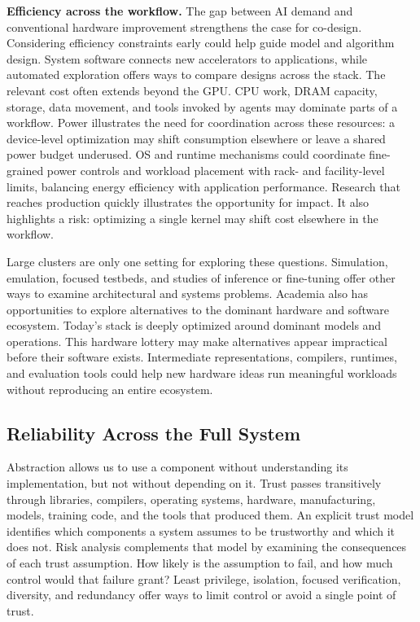 \documentclass[manuscript]{acmart}
\begin{document}
\textbf{Efficiency across the workflow.} The gap between AI demand and conventional hardware improvement strengthens the case for co-design.
Considering efficiency constraints early could help guide model and algorithm design.
System software connects new accelerators to applications, while automated exploration offers ways to compare designs across the stack.
The relevant cost often extends beyond the GPU.
CPU work, DRAM capacity, storage, data movement, and tools invoked by agents may dominate parts of a workflow.
Power illustrates the need for coordination across these resources: a device-level optimization may shift consumption elsewhere or leave a shared power budget underused.
OS and runtime mechanisms could coordinate fine-grained power controls and workload placement with rack- and facility-level limits, balancing energy efficiency with application performance.
Research that reaches production quickly illustrates the opportunity for impact.
It also highlights a risk: optimizing a single kernel may shift cost elsewhere in the workflow.

Large clusters are only one setting for exploring these questions.
Simulation, emulation, focused testbeds, and studies of inference or fine-tuning offer other ways to examine architectural and systems problems.
Academia also has opportunities to explore alternatives to the dominant hardware and software ecosystem.
Today's stack is deeply optimized around dominant models and operations.
This hardware lottery may make alternatives appear impractical before their software exists.
Intermediate representations, compilers, runtimes, and evaluation tools could help new hardware ideas run meaningful workloads without reproducing an entire ecosystem.

\subsection{Reliability Across the Full System}
\label{sec:reliability}

Abstraction allows us to use a component without understanding its implementation,
but not without depending on it.
Trust passes transitively through libraries, compilers, operating systems,
hardware, manufacturing, models, training code, and the tools that produced them.
An explicit trust model identifies which components a system assumes to be trustworthy and which it does not.
Risk analysis complements that model by examining the consequences of each trust assumption.
How likely is the assumption to fail, and how much control would that failure grant?
Least privilege, isolation, focused verification, diversity, and redundancy offer ways to limit control or avoid a single point of trust.
\end{document}
